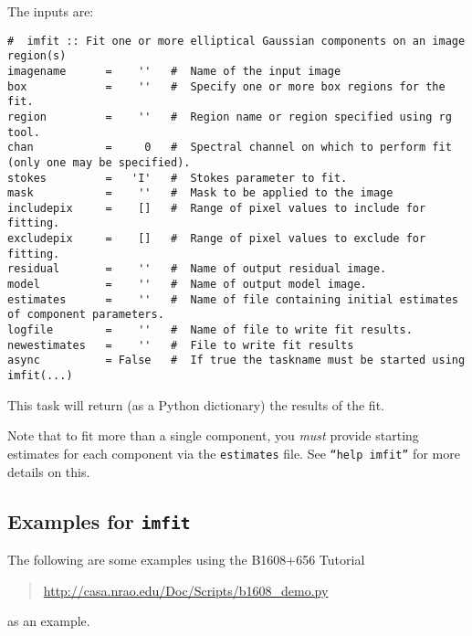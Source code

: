 The inputs are:
\small
\begin{verbatim}
#  imfit :: Fit one or more elliptical Gaussian components on an image region(s)
imagename      =    ''   #  Name of the input image
box            =    ''   #  Specify one or more box regions for the fit.
region         =    ''   #  Region name or region specified using rg tool.
chan           =     0   #  Spectral channel on which to perform fit (only one may be specified).
stokes         =   'I'   #  Stokes parameter to fit.
mask           =    ''   #  Mask to be applied to the image
includepix     =    []   #  Range of pixel values to include for fitting.
excludepix     =    []   #  Range of pixel values to exclude for fitting.
residual       =    ''   #  Name of output residual image.
model          =    ''   #  Name of output model image.
estimates      =    ''   #  Name of file containing initial estimates of component parameters.
logfile        =    ''   #  Name of file to write fit results.
newestimates   =    ''   #  File to write fit results
async          = False   #  If true the taskname must be started using imfit(...)
\end{verbatim}
\normalsize
This task will return (as a Python dictionary) the results of the fit.

Note that to fit more than a single component, you {\em must} provide
starting estimates for each component via the {\tt estimates} file.
See {\tt ``help imfit''} for more details on this.

\subsection{Examples for {\tt imfit}}
\label{section:analysis.imfit.examples}

The following are some examples using the B1608+656 Tutorial
\begin{quote}
  \url{http://casa.nrao.edu/Doc/Scripts/b1608_demo.py}
\end{quote}
as an example.

